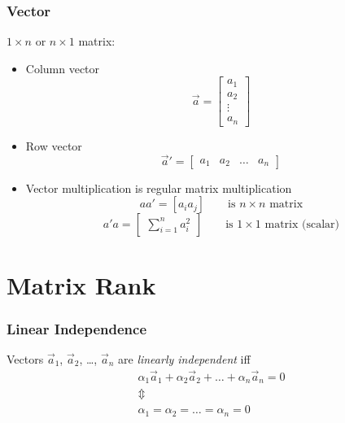 \documentclass[mathserif, xcolor=table, svgnames]{beamer}
\begin{document}
\begin{frame}
  \frametitle{Vector}
  $1\times n$ or $n \times 1$ matrix:
  \begin{itemize}
  \item Column vector
    \begin{equation*}
      \vec{a} = 
      \begin{bmatrix}
        a_{1} \\ a_{2} \\ \vdots \\ a_{n}
      \end{bmatrix}
    \end{equation*}
  \item Row vector
    \begin{equation*}
      \vec{a}' = 
      \begin{bmatrix}
        a_{1} & a_{2} & \hdots & a_{n}
      \end{bmatrix}
    \end{equation*}
  \item Vector multiplication is regular matrix multiplication
    \begin{equation*}
      a a' = [ a_{i} a_{j} ]
      \qquad
      \text{is $n\times n$ matrix}
    \end{equation*}
    \begin{equation*}
      a' a = 
      \begin{bmatrix}
        \sum_{i=1}^{n} a_{i}^{2}
      \end{bmatrix}
      \qquad
      \text{is $1\times 1$ matrix (scalar)}
    \end{equation*}
  \end{itemize}
\end{frame}

\section[Rank]{Matrix Rank}

\begin{frame}
  \frametitle{Linear Independence}
  Vectors $\vec{a}_{1}$, $\vec{a}_{2}$, \dots, $\vec{a}_{n}$ are
  \emph{linearly independent} iff
  \begin{gather*}
    \alpha_{1} \vec{a}_{1} + \alpha_{2} \vec{a}_{2} 
    + \dots + \alpha_{n} \vec{a}_{n} = 0
    \\
    \Updownarrow
    \\
    \alpha_{1} = \alpha_{2} = \dots = \alpha_{n} = 0
  \end{gather*}
\end{frame}
\end{document}

